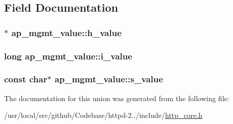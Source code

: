 \subsection{Field Documentation}
\subsubsection[{\texorpdfstring{h\+\_\+value}{h_value}}]{$\ast$ ap\+\_\+mgmt\+\_\+value\+::h\+\_\+value}\hypertarget{unionap__mgmt__value_a6e97af73c1a56b4976fb932634364f0c}{}\label{unionap__mgmt__value_a6e97af73c1a56b4976fb932634364f0c}
\subsubsection[{\texorpdfstring{i\+\_\+value}{i_value}}]{\setlength{\rightskip}{0pt plus 5cm}long ap\+\_\+mgmt\+\_\+value\+::i\+\_\+value}\hypertarget{unionap__mgmt__value_af4b81e8070b6ca778b32c8ab2e5b2d57}{}\label{unionap__mgmt__value_af4b81e8070b6ca778b32c8ab2e5b2d57}
\subsubsection[{\texorpdfstring{s\+\_\+value}{s_value}}]{\setlength{\rightskip}{0pt plus 5cm}const char$\ast$ ap\+\_\+mgmt\+\_\+value\+::s\+\_\+value}\hypertarget{unionap__mgmt__value_a210202c642eeb974aaf11236f74c73ff}{}\label{unionap__mgmt__value_a210202c642eeb974aaf11236f74c73ff}


The documentation for this union was generated from the following file\+:\begin{DoxyCompactItemize}
\item 
/usr/local/src/github/\+Codebase/httpd-\/2../include/\hyperlink{http__core_8h}{http\+\_\+core.\+h}\end{DoxyCompactItemize}
